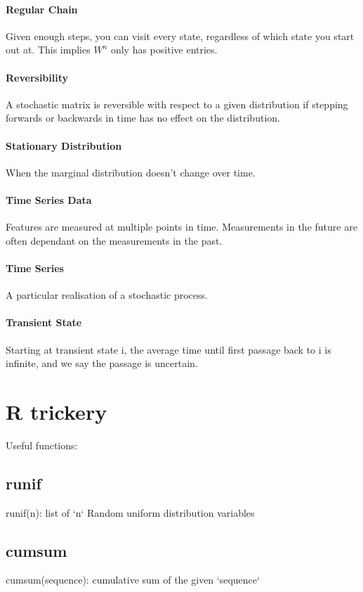 \documentclass[12pt]{article}
\begin{document}
    \paragraph{Regular Chain} Given enough steps, you can visit every state, regardless of which state you start out at. This implies \(W^n\) only has positive entries.
    \paragraph{Reversibility} A stochastic matrix is reversible with respect to a given distribution if stepping forwards or backwards in time has no effect on the distribution.
    \paragraph{Stationary Distribution} When the marginal distribution doesn't change over time.
    \paragraph{Time Series Data} Features are measured at multiple points in time. Measurements in the future are often dependant on the measurements in the past.
    \paragraph{Time Series} A particular realisation of a stochastic process.
    \paragraph{Transient State} Starting at transient state i, the average time until first passage back to i is infinite, and we say the passage is uncertain.
\section{R trickery}
Useful functions:
\subsection{runif}
runif(n): list of `n` Random uniform distribution variables
\subsection{cumsum} cumsum(sequence): cumulative sum of the given `sequence`
\end{document}
